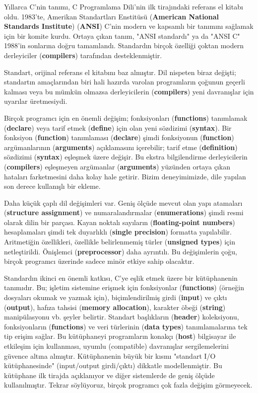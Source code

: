 \documentclass[a4paper,12pt,oneside]{book}
\begin{document}
\thispagestyle{introduction} \par Yıllarca C'nin tanımı, C Programlama Dili'nin ilk tirajındaki referans el kitabı oldu. 1983'te, Amerikan Standartları Enstitüsü (\textbf{American National Standards Institute}) (\textbf{ANSI}) C'nin modern ve kapsamlı bir tanımını sağlamak için bir komite kurdu. Ortaya çıkan tanım, "ANSI standardı" ya da "ANSI C" 1988'in sonlarına doğru tamamlandı. Standardın birçok özelliği çoktan modern derleyiciler (\textbf{compilers}) tarafından desteklenmiştir.
\par Standart, orijinal referans el kitabını baz almıştır. Dil nispeten biraz değişti; standartın amaçlarından biri hali hazırda varolan programların çoğunun geçerli kalması veya bu mümkün olmazsa derleyicilerin (\textbf{compilers}) yeni davranışlar için uyarılar üretmesiydi.
\par Birçok programcı için en önemli değişim; fonksiyonları (\textbf{functions}) tanımlamak (\textbf{declare}) veya tarif etmek (\textbf{define}) için olan yeni sözdizimi (\textbf{syntax}). Bir fonksiyon (\textbf{function}) tanımlaması (\textbf{declare}) şimdi fonksiyonun (\textbf{function}) argümanlarının (\textbf{arguments}) açıklamasını içerebilir; tarif etme (\textbf{definition}) sözdizimi (\textbf{syntax}) eşleşmek üzere değişir. Bu ekstra bilgilendirme derleyicilerin (\textbf{compilers}) eşleşmeyen argümanlar (\textbf{arguments}) yüzünden ortaya çıkan hataları farketmesini daha kolay hale getirir. Bizim deneyimimizde, dile yapılan son derece kullanışlı bir ekleme.
\par Daha küçük çaplı dil değişimleri var. Geniş ölçüde mevcut olan yapı atamaları (\textbf{structure assignment}) ve numaralandırmalar (\textbf{enumerations}) şimdi resmi olarak dilin bir parçası. Kayan noktalı sayıların (\textbf{floating-point numbers}) hesaplamaları şimdi tek duyarlıklı (\textbf{single precision}) formatta yapılabilir. Aritmetiğin özellikleri, özellikle belirlenmemiş türler (\textbf{unsigned types}) için netleştirildi. Önişlemci (\textbf{preprocessor}) daha ayrıntılı. Bu değişimlerin çoğu, birçok programcı üzerinde sadece minör etkiye sahip olacaktır.
\par Standardın ikinci en önemli katkısı, C'ye eşlik etmek üzere bir kütüphanenin tanımıdır. Bu; işletim sistemine erişmek için fonksiyonlar (\textbf{functions}) (örneğin dosyaları okumak ve yazmak için), biçimlendirilmiş girdi (\textbf{input}) ve çıktı (\textbf{output}), hafıza tahsisi (\textbf{memory allocation}), karakter öbeği (\textbf{string}) manipülasyonu vb. şeyler belirtir. Standart başlıkların (\textbf{header}) koleksiyonu, fonksiyonların (\textbf{functions}) ve veri türlerinin (\textbf{data types}) tanımlamalarına tek tip erişim sağlar. Bu kütüphaneyi programların konakçı (\textbf{host}) bilgisayar ile etkileşim için kullanması, uyumlu (compatible) davranışlar sergilemelerini güvence altına almıştır. Kütüphanenin büyük bir kısmı "standart I/O kütüphanesinde" (input/output girdi/çıktı) dikkatle modellenmiştir. Bu kütüphane ilk tirajda açıklanıyor ve diğer sistemlerde de geniş ölçüde kullanılmıştır. Tekrar söylüyoruz, birçok programcı çok fazla değişim görmeyecek.
\end{document}
